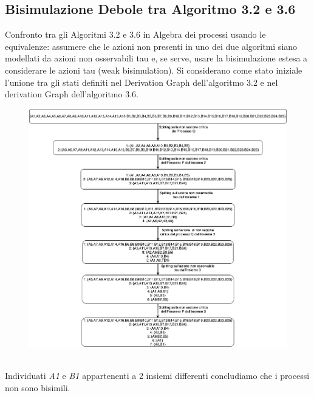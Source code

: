 \documentclass{article}
\begin{document}
\subsection{Bisimulazione Debole tra Algoritmo 3.2 e 3.6}
Confronto tra gli Algoritmi 3.2 e 3.6 in Algebra dei processi usando le equivalenze: assumere che le azioni non presenti in uno dei due algoritmi siano modellati da azioni non osservabili tau e, se serve, usare la bisimulazione estesa a considerare le azioni tau (weak bisimulation). 
Si considerano come stato iniziale l'unione tra gli stati definiti nel Derivation Graph dell'algoritmo 3.2 e nel derivation Graph dell'algoritmo 3.6.
\begin{figure}[h] 
\centering
\includegraphics[scale=0.55]{Untitled Diagram-4.png}
\end{figure}
\\Individuati \textit{A1} e \textit{B1} appartenenti a 2 insiemi differenti concludiamo che i processi non sono bisimili.
\clearpage
\end{document}
